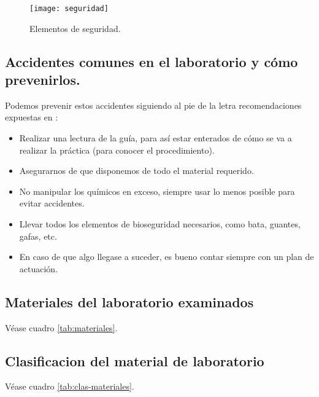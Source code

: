 \documentclass[letterpaper]{IEEEconf}
\begin{document}
\begin{figure}[H]
\centering
\texttt{[image: seguridad]}
\caption{Elementos de seguridad.}
\end{figure} 

\subsection{Accidentes comunes en el laboratorio y cómo prevenirlos.}
Podemos prevenir estos accidentes siguiendo al pie de la letra recomendaciones expuestas en \cite{Seglab}:
\begin{itemize}
\item Realizar una lectura de la guía, para así estar enterados de cómo se va a realizar la práctica (para conocer el procedimiento). 
\item Asegurarnos de que disponemos de todo el material requerido. 
\item No manipular los químicos en exceso, siempre usar lo menos posible para evitar accidentes.
\item Llevar todos los elementos de bioseguridad necesarios, como bata, guantes, gafas, etc.
\item En caso de que algo llegase a suceder, es bueno contar siempre con un plan de actuación.
\end{itemize}

\subsection{Materiales del laboratorio examinados}

Véase cuadro \ref{tab:materiales}.

\subsection{Clasificacion del material de laboratorio}

Véase cuadro \ref{tab:clas-materiales}.
\end{document}
